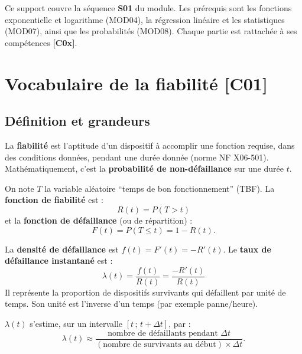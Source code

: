 \documentclass[a4paper,11pt]{article}
\begin{document}
\begin{remarque}
Ce support couvre la séquence \textbf{S01} du module. Les prérequis sont les fonctions exponentielle et logarithme (MOD04), la régression linéaire et les statistiques (MOD07), ainsi que les probabilités (MOD08). Chaque partie est rattachée à ses compétences \textbf{[C0x]}.
\end{remarque}

\newpage
\tableofcontents
\newpage

\section{Vocabulaire de la fiabilité \hfill {\normalsize\color{uimmred}[C01]}}

\subsection{Définition et grandeurs}

\begin{definition}
La \textbf{fiabilité} est l'aptitude d'un dispositif à accomplir une fonction requise, dans des conditions données, pendant une durée donnée (norme NF X06-501). Mathématiquement, c'est la \textbf{probabilité de non-défaillance} sur une durée $t$.
\end{definition}

\begin{definition}
On note $T$ la variable aléatoire ``temps de bon fonctionnement'' (TBF). La \textbf{fonction de fiabilité} est :
\[
\boxed{R(t) = P(T > t)}
\]
et la \textbf{fonction de défaillance} (ou de répartition) :
\[
F(t) = P(T \leq t) = 1 - R(t).
\]
\end{definition}

\begin{definition}
La \textbf{densité de défaillance} est $f(t) = F'(t) = -R'(t)$. Le \textbf{taux de défaillance instantané} est :
\[
\boxed{\lambda(t) = \frac{f(t)}{R(t)} = \frac{-R'(t)}{R(t)}}
\]
Il représente la proportion de dispositifs survivants qui défaillent par unité de temps. Son unité est l'inverse d'un temps (par exemple panne/heure).
\end{definition}

\begin{remarque}
$\lambda(t)$ s'estime, sur un intervalle $[t\,;\,t+\Delta t]$, par :
\[
\lambda(t) \approx \frac{\text{nombre de défaillants pendant }\Delta t}{(\text{nombre de survivants au début})\times \Delta t}.
\]
\end{remarque}
\end{document}
